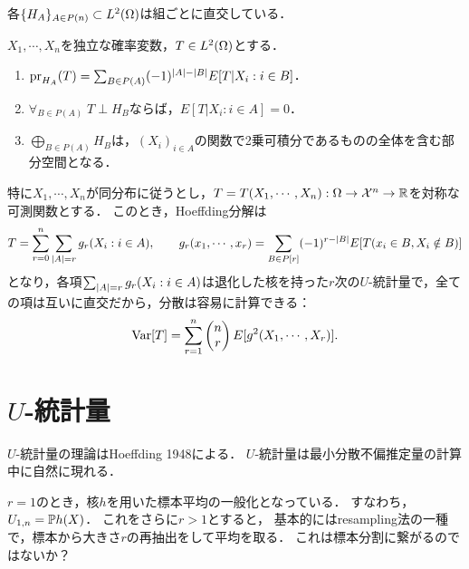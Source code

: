 \documentclass[uplatex,dvipdfmx]{jsreport}
\begin{document}
\begin{lemma}
    各$\{H_A\}_{A\in P(n)}\subset L^2(\Omega)$は組ごとに直交している．
\end{lemma}

\begin{theorem}
    $X_1,\cdots,X_n$を独立な確率変数，$T\in L^2(\Omega)$とする．
    \begin{enumerate}
        \item $\mathrm{pr}_{H_A}(T)=\sum_{B\in P(A)}(-1)^{\lvert A\rvert-\lvert B\rvert}E[T|X_i:i\in B]$．
        \item $\forall_{B\in P(A)}\;T\perp H_B$ならば，$E[T|X_i:i\in A]=0$．
        \item $\bigoplus_{B\in P(A)}H_B$は，$(X_i)_{i\in A}$の関数で2乗可積分であるものの全体を含む部分空間となる．
    \end{enumerate}
\end{theorem}

\begin{remarks}
    特に$X_1,\cdots,X_n$が同分布に従うとし，$T=T(X_1,\cdots,X_n):\Omega\to\mathcal{X}^n\to\mathbb{R}$を対称な可測関数とする．
    このとき，Hoeffding分解は
    \[T=\sum^n_{r=0}\sum_{\lvert A\rvert=r}g_r(X_i:i\in A),\qquad g_r(x_1,\cdots,x_r)=\sum_{B\in P[r]}(-1)^{r-\lvert B\rvert}E[T(x_i\in B,X_i\notin B)]\]
    となり，各項$\sum_{\lvert A\rvert=r}g_r(X_i:i\in A)$は退化した核を持った$r$次の$U$-統計量で，全ての項は互いに直交だから，分散は容易に計算できる：
    \[\mathrm{Var}[T]=\sum_{r=1}^n \begin{pmatrix}n\\r\end{pmatrix}E[g^2(X_1,\cdots,X_r)].\]
\end{remarks}



\section{$U$-統計量}

\begin{tcolorbox}[colframe=ForestGreen, colback=ForestGreen!10!white,breakable,colbacktitle=ForestGreen!40!white,coltitle=black,fonttitle=\bfseries\sffamily,
title=]
    $U$-統計量の理論はHoeffding 1948による．
    $U$-統計量は最小分散不偏推定量の計算中に自然に現れる．

    $r=1$のとき，核$h$を用いた標本平均の一般化となっている．
    すなわち，$U_{1,n}=\mathbb{P} h(X)$．
    これをさらに$r>1$とすると，
    基本的にはresampling法の一種で，標本から大きさ$r$の再抽出をして平均を取る．
    これは標本分割に繋がるのではないか？
\end{tcolorbox}
\end{document}
